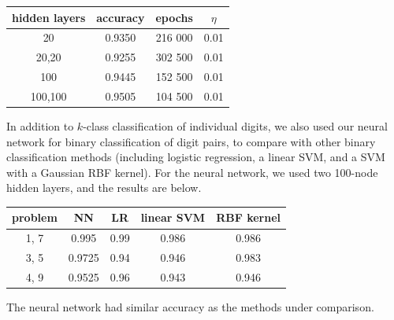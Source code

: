 \documentclass{article}
\begin{document}
\begin{multicols}{2}


\begin{center}
\begin{tabular}{c|c|c|c}
hidden layers & accuracy	& epochs & $\eta$ \\\hline
        20		& 0.9350 	& 216 000 	& 0.01\\
        20,20	& 0.9255 	& 302 500 	& 0.01\\
        100		& 0.9445 	& 152 500 	& 0.01 \\
        100,100	& 0.9505 	& 104 500 	& 0.01
\end{tabular}
\end{center}









In addition to $k$-class classification of individual digits,
we also used our neural network for binary classification of digit pairs,
to compare with other binary classification methods
(including logistic regression, a linear SVM,
and a SVM with a Gaussian RBF kernel).
For the neural network, we used two 100-node hidden layers,
and the results are below.

\begin{center}
\begin{tabular}{c|c|c|c|c}
problem		& NN	& LR		& linear SVM	& RBF kernel \\\hline
        1, 7		& 0.995 	& 0.99 	& 0.986		& 0.986 \\
        3, 5		& 0.9725 	& 0.94 	& 0.946		& 0.983 \\
        4, 9		& 0.9525 	& 0.96 	& 0.943 		& 0.946 \\
\end{tabular}
\end{center}
The neural network had similar accuracy as the methods under comparison.


\end{multicols}
\end{document}
